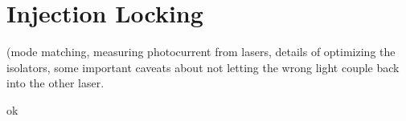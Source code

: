  \chapter{Injection Locking}
 (mode matching, measuring photocurrent from lasers, details of optimizing the isolators, some important caveats about not letting the wrong light couple back into the other laser. 

ok
